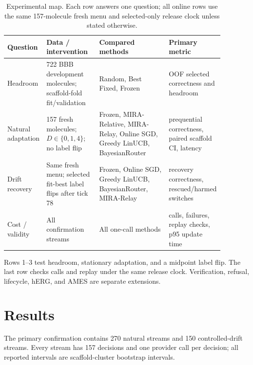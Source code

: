 \documentclass[sigconf,anonymous]{aamas}
\begin{document}
\begin{table}[t]
\caption{Experimental map. Each row answers one question; all online rows use the same 157-molecule fresh menu and selected-only release clock unless stated otherwise.}
\label{tab:matrix}
\footnotesize
{\setlength{\tabcolsep}{2pt}
\begin{tabular}{@{}P{0.15\linewidth}P{0.25\linewidth}P{0.34\linewidth}P{0.14\linewidth}@{}}
\toprule
Question & Data / intervention & Compared methods & Primary metric \\
\midrule
Headroom & 722 BBB development molecules; scaffold-fold fit/validation & Random, Best Fixed, Frozen & OOF selected correctness and headroom \\
Natural adaptation & 157 fresh molecules; $D\in\{0,1,4\}$; no label flip & Frozen, MIRA-Relative, MIRA-Relay, Online SGD, Greedy LinUCB, BayesianRouter & prequential correctness, paired scaffold CI, latency \\
Drift recovery & Same fresh menu; selected fit-best label flips after tick 78 & Frozen, Online SGD, Greedy LinUCB, BayesianRouter, MIRA-Relay & recovery correctness, rescued/harmed switches \\
Cost / validity & All confirmation streams & All one-call methods & calls, failures, replay checks, p95 update time \\
\bottomrule
\end{tabular}}
\end{table}

Rows 1--3 test headroom, stationary adaptation, and a midpoint label flip. The last row checks calls and replay under the same release clock. Verification, refusal, lifecycle, hERG, and AMES are separate extensions.

\section{Results}
The primary confirmation contains 270 natural streams and 150 controlled-drift streams. Every stream has 157 decisions and one provider call per decision; all reported intervals are scaffold-cluster bootstrap intervals.
\end{document}
